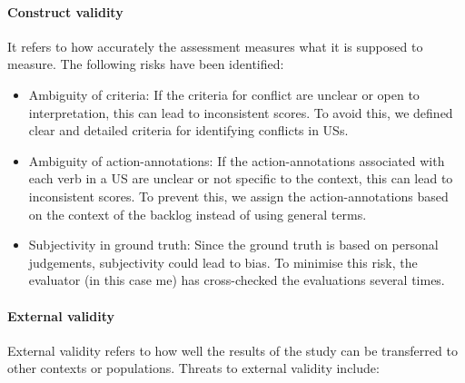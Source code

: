 \paragraph{Construct validity}It refers to how accurately the assessment measures what it is supposed to measure. The following risks have been identified:
\begin{itemize}
	\item Ambiguity of criteria: If the criteria for conflict are unclear or open to interpretation, this can lead to inconsistent scores. To avoid this, we defined clear and detailed criteria for identifying conflicts in USs.
	
	\item Ambiguity of action-annotations: If the action-annotations associated with each verb in a US are unclear or not specific to the context, this can lead to inconsistent scores. To prevent this, we assign the action-annotations based on the context of the backlog instead of using general terms.
	
	\item Subjectivity in ground truth: Since the ground truth is based on personal judgements, subjectivity could lead to bias. To minimise this risk, the evaluator (in this case me) has cross-checked the evaluations several times.
\end{itemize}
\paragraph{External validity}External validity refers to how well the results of the study can be transferred to other contexts or populations. Threats to external validity include:

